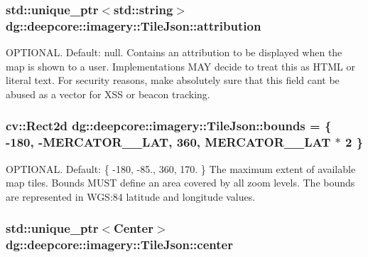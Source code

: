 \subsubsection[{\texorpdfstring{attribution}{attribution}}]{\setlength{\rightskip}{0pt plus 5cm}std\+::unique\+\_\+ptr$<$std\+::string$>$ dg\+::deepcore\+::imagery\+::\+Tile\+Json\+::attribution}\hypertarget{structdg_1_1deepcore_1_1imagery_1_1_tile_json_aaa14afeb610f9e02b8ffb7e6641160d6}{}\label{structdg_1_1deepcore_1_1imagery_1_1_tile_json_aaa14afeb610f9e02b8ffb7e6641160d6}
O\+P\+T\+I\+O\+N\+AL. Default\+: null. Contains an attribution to be displayed when the map is shown to a user. Implementations M\+AY decide to treat this as H\+T\+ML or literal text. For security reasons, make absolutely sure that this field can\textquotesingle{}t be abused as a vector for X\+SS or beacon tracking. 
\subsubsection[{\texorpdfstring{bounds}{bounds}}]{\setlength{\rightskip}{0pt plus 5cm}cv\+::\+Rect2d dg\+::deepcore\+::imagery\+::\+Tile\+Json\+::bounds = \{ -\/180, -\/{\bf M\+E\+R\+C\+A\+T\+O\+R\+\_\+\_\+\+L\+AT}, 360, {\bf M\+E\+R\+C\+A\+T\+O\+R\+\_\+\_\+\+L\+AT} $\ast$ 2 \}}\hypertarget{structdg_1_1deepcore_1_1imagery_1_1_tile_json_a7c0423d8989a5e6b0f5600ac5223b823}{}\label{structdg_1_1deepcore_1_1imagery_1_1_tile_json_a7c0423d8989a5e6b0f5600ac5223b823}
O\+P\+T\+I\+O\+N\+AL. Default\+: \{ -\/180, -\/85., 360, 170. \} The maximum extent of available map tiles. Bounds M\+U\+ST define an area covered by all zoom levels. The bounds are represented in W\+GS\+:84 latitude and longitude values. 
\subsubsection[{\texorpdfstring{center}{center}}]{\setlength{\rightskip}{0pt plus 5cm}std\+::unique\+\_\+ptr$<${\bf Center}$>$ dg\+::deepcore\+::imagery\+::\+Tile\+Json\+::center}\hypertarget{structdg_1_1deepcore_1_1imagery_1_1_tile_json_a774610a2770889bf336b90335a93f4c1}{}\label{structdg_1_1deepcore_1_1imagery_1_1_tile_json_a774610a2770889bf336b90335a93f4c1}
